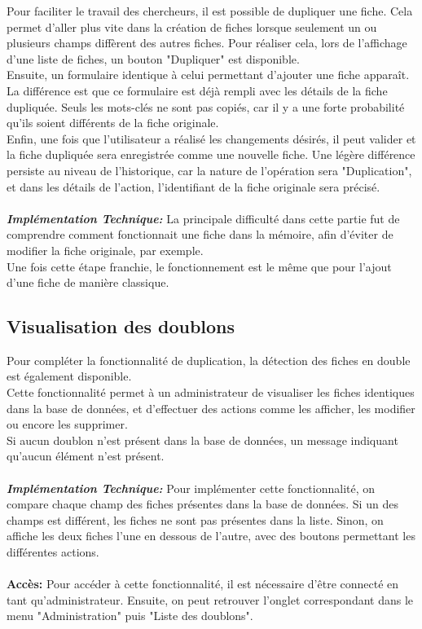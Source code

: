 \documentclass[12pt]{article}
\begin{document}
    Pour faciliter le travail des chercheurs, il est possible de dupliquer une fiche. Cela permet d'aller plus vite dans la création de fiches lorsque seulement un ou plusieurs champs diffèrent des autres fiches.
    Pour réaliser cela, lors de l'affichage d'une liste de fiches, un bouton "Dupliquer" est disponible.\\
    Ensuite, un formulaire identique à celui permettant d'ajouter une fiche apparaît. La différence est que ce formulaire est déjà rempli avec les détails de la fiche dupliquée. Seuls les mots-clés ne sont pas copiés, car il y a une forte probabilité qu'ils soient différents de la fiche originale.\\
    Enfin, une fois que l'utilisateur a réalisé les changements désirés, il peut valider et la fiche dupliquée sera enregistrée comme une nouvelle fiche.
    Une légère différence persiste au niveau de l'historique, car la nature de l'opération sera "Duplication", et dans les détails de l'action, l'identifiant de la fiche originale sera précisé.
    \\
    \\
    \textit{\textbf{Implémentation Technique:}}
    La principale difficulté dans cette partie fut de comprendre comment fonctionnait une fiche dans la mémoire, afin d'éviter de modifier la fiche originale, par exemple.
    \\
    Une fois cette étape franchie, le fonctionnement est le même que pour l'ajout d'une fiche de manière classique.

    \subsection{Visualisation des doublons}

    Pour compléter la fonctionnalité de duplication, la détection des fiches en double est également disponible.
    \\
    Cette fonctionnalité permet à un administrateur de visualiser les fiches identiques dans la base de données, et d'effectuer des actions comme les afficher, les modifier ou encore les supprimer.
    \\
    Si aucun doublon n'est présent dans la base de données, un message indiquant qu'aucun élément n'est présent.
    \\
    \\
    \textit{\textbf{Implémentation Technique:}}
    Pour implémenter cette fonctionnalité, on compare chaque champ des fiches présentes dans la base de données. Si un des champs est différent, les fiches ne sont pas présentes dans la liste. Sinon, on affiche les deux fiches l'une en dessous de l'autre, avec des boutons permettant les différentes actions.
    \\
    \\
    \textbf{Accès: }
    Pour accéder à cette fonctionnalité, il est nécessaire d'être connecté en tant qu'administrateur. Ensuite, on peut retrouver l'onglet correspondant dans le menu "Administration" puis "Liste des doublons".
\end{document}
